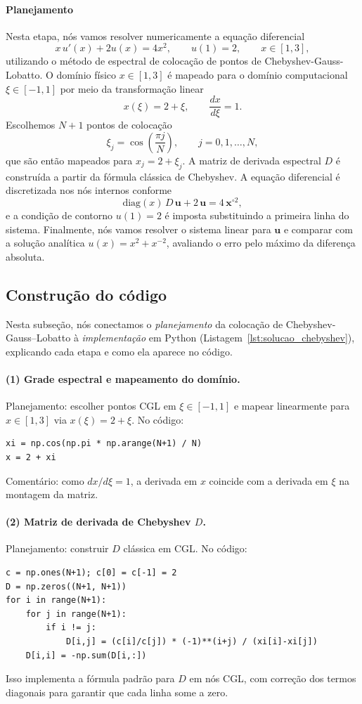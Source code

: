 \documentclass[11pt,a4paper]{article}
\begin{document}
\paragraph{Planejamento}
Nesta etapa, nós vamos resolver numericamente a equação diferencial
\[
x\,u'(x)+2u(x)=4x^{2}, \qquad u(1)=2, \qquad x\in[1,3],
\]
utilizando o método de espectral de colocação de pontos de Chebyshev-Gauss-Lobatto.  
O domínio físico $x\in[1,3]$ é mapeado para o domínio computacional $\xi\in[-1,1]$ por meio da transformação linear
\[
x(\xi) = 2 + \xi, \qquad \frac{dx}{d\xi} = 1.
\]
Escolhemos $N+1$ pontos de colocação
\[
\xi_j = \cos\!\left(\frac{\pi j}{N}\right), \qquad j = 0,1,\dots,N,
\]
que são então mapeados para $x_j = 2 + \xi_j$.  
A matriz de derivada espectral $D$ é construída a partir da fórmula clássica de Chebyshev.  
A equação diferencial é discretizada nos nós internos conforme
\[
\mathrm{diag}(x)\,D\,\mathbf{u} + 2\,\mathbf{u} = 4\,\mathbf{x}^{\circ 2},
\]
e a condição de contorno $u(1)=2$ é imposta substituindo a primeira linha do sistema.  
Finalmente, nós vamos resolver o sistema linear para $\mathbf{u}$ e comparar com a solução analítica $u(x)=x^{2}+x^{-2}$, avaliando o erro pelo máximo da diferença absoluta.

\subsection{Construção do código}

Nesta subseção, nós conectamos o \emph{planejamento} da colocação de Chebyshev-Gauss–Lobatto à \emph{implementação} em Python (Listagem~\ref{lst:solucao_chebyshev}), explicando cada etapa e como ela aparece no código.

\paragraph{(1) Grade espectral e mapeamento do domínio.}
Planejamento: escolher pontos CGL em $\xi\in[-1,1]$ e mapear linearmente para $x\in[1,3]$ via $x(\xi)=2+\xi$.
No código:
\begin{verbatim}
xi = np.cos(np.pi * np.arange(N+1) / N)
x = 2 + xi
\end{verbatim}
Comentário: como $dx/d\xi=1$, a derivada em $x$ coincide com a derivada em $\xi$ na montagem da matriz.

\paragraph{(2) Matriz de derivada de Chebyshev $D$.}
Planejamento: construir $D$ clássica em CGL.
No código:
\begin{verbatim}
c = np.ones(N+1); c[0] = c[-1] = 2
D = np.zeros((N+1, N+1))
for i in range(N+1):
    for j in range(N+1):
        if i != j:
            D[i,j] = (c[i]/c[j]) * (-1)**(i+j) / (xi[i]-xi[j])
    D[i,i] = -np.sum(D[i,:])
\end{verbatim}
Isso implementa a fórmula padrão para $D$ em nós CGL, com correção dos termos diagonais para garantir que cada linha some a zero.
\end{document}
